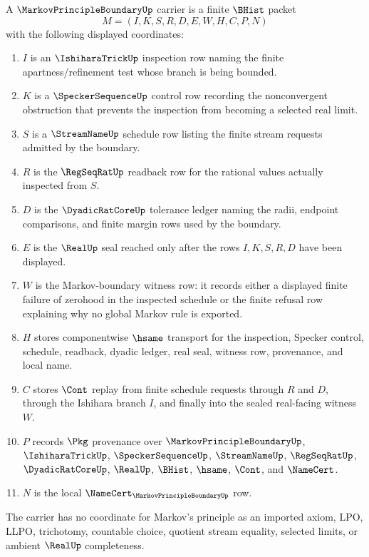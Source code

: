 \begin{definition}
\label{def:markov-principle-boundary-carrier}
A $\MarkovPrincipleBoundaryUp$ carrier is a finite $\BHist$ packet
$$
M=(I,K,S,R,D,E,W,H,C,P,N)
$$
with the following displayed coordinates:
\begin{enumerate}
\item $I$ is an $\IshiharaTrickUp$ inspection row naming the finite apartness/refinement test whose branch is being bounded.
\item $K$ is a $\SpeckerSequenceUp$ control row recording the nonconvergent obstruction that prevents the inspection from becoming a selected real limit.
\item $S$ is a $\StreamNameUp$ schedule row listing the finite stream requests admitted by the boundary.
\item $R$ is the $\RegSeqRatUp$ readback row for the rational values actually inspected from $S$.
\item $D$ is the $\DyadicRatCoreUp$ tolerance ledger naming the radii, endpoint comparisons, and finite margin rows used by the boundary.
\item $E$ is the $\RealUp$ seal reached only after the rows $I,K,S,R,D$ have been displayed.
\item $W$ is the Markov-boundary witness row: it records either a displayed finite failure of zerohood in the inspected schedule or the finite refusal row explaining why no global Markov rule is exported.
\item $H$ stores componentwise $\hsame$ transport for the inspection, Specker control, schedule, readback, dyadic ledger, real seal, witness row, provenance, and local name.
\item $C$ stores $\Cont$ replay from finite schedule requests through $R$ and $D$, through the Ishihara branch $I$, and finally into the sealed real-facing witness $W$.
\item $P$ records $\Pkg$ provenance over $\MarkovPrincipleBoundaryUp$, $\IshiharaTrickUp$, $\SpeckerSequenceUp$, $\StreamNameUp$, $\RegSeqRatUp$, $\DyadicRatCoreUp$, $\RealUp$, $\BHist$, $\hsame$, $\Cont$, and $\NameCert$.
\item $N$ is the local $\NameCert_{\MarkovPrincipleBoundaryUp}$ row.
\end{enumerate}
The carrier has no coordinate for Markov's principle as an imported axiom, LPO, LLPO, trichotomy, countable choice, quotient stream equality, selected limits, or ambient $\RealUp$ completeness.
\end{definition}

